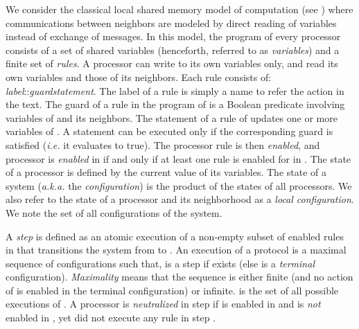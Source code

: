 \documentclass[11pt,english,letterpaper]{article}
\begin{document}
We consider the classical local shared memory model of computation (see \cite{D00b}) where communications between neighbors are modeled by direct reading of variables instead of exchange of messages. In this model, the program of every processor consists of a set of shared variables (henceforth, referred to as \emph{variables}) and a finite set of \emph{rules}. A processor can write to its own variables only, and read its own variables and those of its neighbors. Each rule consists of: \emph{label}::\emph{guard}\emph{statement}. The label of a rule is simply a name to refer the action in the text. The guard of a rule in the program of  is a Boolean predicate involving variables of  and its neighbors. The statement of a rule of  updates one or more variables of . A statement can be executed only if the corresponding guard is satisfied (\emph{i.e.} it evaluates to true). The processor rule is then \emph{enabled}, and processor  is \emph{enabled} in  if and only if at least one rule is enabled for  in . The state of a processor is defined by the current value of its variables. The state of a system (\emph{a.k.a.} the \emph{configuration}) is the product of the states of all processors. We also refer to the state of a processor and its neighborhood as a \emph{local configuration}. We note  the set of all configurations of the system. 

A \emph{step}  is defined as an atomic execution of a non-empty subset of enabled rules in  that transitions the system from  to . An execution of a protocol  is a maximal sequence of configurations  such that,  is a step if  exists (else  is a \emph{terminal} configuration). \emph{Maximality} means that the sequence is either finite (and no action of  is enabled in the terminal configuration) or infinite.  is the set of all possible executions of . A processor  is \emph{neutralized} in step  if  is enabled in  and is \emph{not} enabled in , yet did not execute any rule in step .
\end{document}
